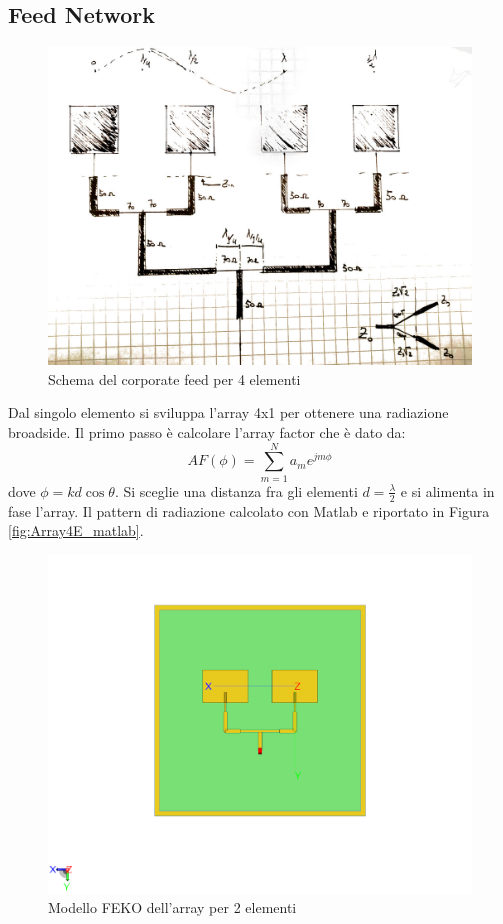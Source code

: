 \documentclass[twoside,twocolumn]{article}
\begin{document}
\subsection*{Feed Network}
\begin{figure}[h!]
  \includegraphics[width=\linewidth]{Array4E_Schema.jpg}
  \caption{Schema del corporate feed per 4 elementi}
  \label{fig:Array4E_Schema}
\end{figure}
Dal singolo elemento si sviluppa l'array 4x1 per ottenere una radiazione broadside.
Il primo passo è calcolare l'array factor che è dato da:
\begin{equation}
AF(\phi)=\sum_{m=1}^{N} a_{m} e^{jm \phi}
\end{equation}
dove $\phi=kd\cos\theta$.\newline
Si sceglie una distanza fra gli elementi  $d=\frac{\lambda}{2}$ e si alimenta in fase l'array.
Il pattern di radiazione calcolato con Matlab e riportato in Figura \ref{fig:Array4E_matlab}.
\begin{figure}[h]
  \includegraphics[width=\linewidth]{Array2E_Cad.png}
  \caption{Modello FEKO dell'array per 2 elementi}
  \label{fig:Array2E_Cad}
\end{figure}
\end{document}
